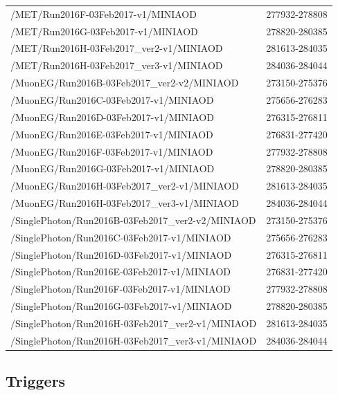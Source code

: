 \begin{table}[htbp]
\begin{tabular}{|l|r|}
  /MET/Run2016F-03Feb2017-v1/MINIAOD                  & 277932-278808 \\
  /MET/Run2016G-03Feb2017-v1/MINIAOD                  & 278820-280385 \\
  /MET/Run2016H-03Feb2017\_ver2-v1/MINIAOD            & 281613-284035 \\
  /MET/Run2016H-03Feb2017\_ver3-v1/MINIAOD            & 284036-284044 \\
\hline
  /MuonEG/Run2016B-03Feb2017\_ver2-v2/MINIAOD         & 273150-275376 \\
  /MuonEG/Run2016C-03Feb2017-v1/MINIAOD               & 275656-276283 \\
  /MuonEG/Run2016D-03Feb2017-v1/MINIAOD               & 276315-276811 \\
  /MuonEG/Run2016E-03Feb2017-v1/MINIAOD               & 276831-277420 \\
  /MuonEG/Run2016F-03Feb2017-v1/MINIAOD               & 277932-278808 \\
  /MuonEG/Run2016G-03Feb2017-v1/MINIAOD               & 278820-280385 \\
  /MuonEG/Run2016H-03Feb2017\_ver2-v1/MINIAOD         & 281613-284035 \\
  /MuonEG/Run2016H-03Feb2017\_ver3-v1/MINIAOD         & 284036-284044 \\
\hline
  /SinglePhoton/Run2016B-03Feb2017\_ver2-v2/MINIAOD   & 273150-275376 \\
  /SinglePhoton/Run2016C-03Feb2017-v1/MINIAOD         & 275656-276283 \\
  /SinglePhoton/Run2016D-03Feb2017-v1/MINIAOD         & 276315-276811 \\
  /SinglePhoton/Run2016E-03Feb2017-v1/MINIAOD         & 276831-277420 \\
  /SinglePhoton/Run2016F-03Feb2017-v1/MINIAOD         & 277932-278808 \\
  /SinglePhoton/Run2016G-03Feb2017-v1/MINIAOD         & 278820-280385 \\
  /SinglePhoton/Run2016H-03Feb2017\_ver2-v1/MINIAOD   & 281613-284035 \\
  /SinglePhoton/Run2016H-03Feb2017\_ver3-v1/MINIAOD   & 284036-284044 \\
\hline
\end{tabular}
\end{table}

\subsection{Triggers}
\label{ssec:stop:triggers}

